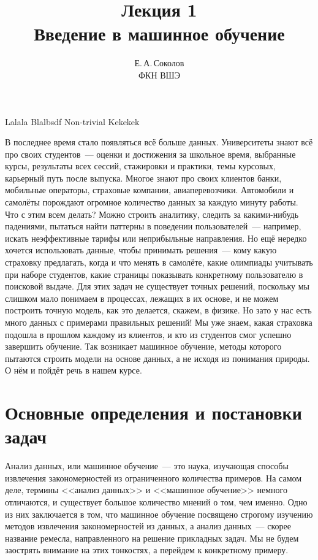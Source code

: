 \documentclass[12pt,fleqn]{article}
\begin{document}
\title{Лекция 1\\Введение в машинное обучение}
\author{Е.\,А.\,Соколов\\ФКН ВШЭ}
\maketitle

Lalala
Blalbsdf
Non-trivial
Kekekek

В последнее время стало появляться всё больше данных.
Университеты знают всё про своих студентов~--- оценки и достижения за школьное время,
выбранные курсы, результаты всех сессий, стажировки и практики, темы курсовых,
карьерный путь после выпуска.
Многое знают про своих клиентов банки, мобильные операторы, страховые компании, авиаперевозчики.
Автомобили и самолёты порождают огромное количество данных за каждую минуту работы.
Что с этим всем делать?
Можно строить аналитику, следить за какими-нибудь падениями, пытаться найти паттерны в поведении
пользователей~--- например, искать неэффективные тарифы или неприбыльные направления.
Но ещё нередко хочется использовать данные, чтобы принимать решения~--- кому какую страховку предлагать,
когда и что менять в самолёте, какие олимпиады учитывать при наборе студентов,
какие страницы показывать конкретному пользователю в поисковой выдаче.
Для этих задач не существует точных решений, поскольку мы слишком мало понимаем в процессах,
лежащих в их основе, и не можем построить точную модель, как это делается, скажем, в физике.
Но зато у нас есть много данных с примерами правильных решений!
Мы уже знаем, какая страховка подошла в прошлом каждому из клиентов,
и кто из студентов смог успешно завершить обучение.
Так возникает машинное обучение, методы которого пытаются строить модели
на основе данных, а не исходя из понимания природы.
О нём и пойдёт речь в нашем курсе.

\section{Основные определения и постановки задач}
Анализ данных, или машинное обучение~--- это наука, изучающая способы извлечения закономерностей
из ограниченного количества примеров.
На самом деле, термины <<анализ данных>> и <<машинное обучение>> немного отличаются, и существует большое
количество мнений о том, чем именно.
Одно из них заключается в том, что машинное обучение посвящено строгому
изучению методов извлечения закономерностей из данных,
а анализ данных~--- скорее название ремесла, направленного на решение прикладных задач.
Мы не будем заострять внимание на этих тонкостях, а перейдем к конкретному примеру.
\end{document}
